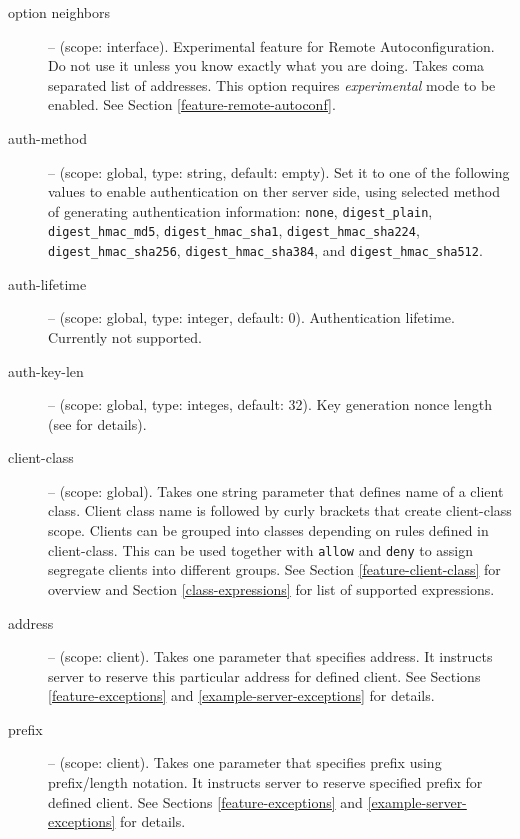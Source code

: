 \begin{description}
 \item[option neighbors] -- (scope: interface). Experimental feature
   for Remote Autoconfiguration. Do not use it unless you know exactly
   what you are doing. Takes coma separated list of addresses. This
   option requires \emph{experimental} mode to be enabled. See Section
   \ref{feature-remote-autoconf}.

 \item[auth-method] -- (scope: global, type: string, default:
   empty). Set it to one of the following values to enable
   authentication on ther server side, using selected method of
   generating authentication information:
   \texttt{none}, \texttt{digest\_plain}, \texttt{digest\_hmac\_md5},
   \texttt{digest\_hmac\_sha1}, \texttt{digest\_hmac\_sha224},
   \texttt{digest\_hmac\_sha256}, \texttt{digest\_hmac\_sha384},
   and \texttt{digest\_hmac\_sha512}.

 \item[auth-lifetime] -- (scope: global, type: integer, default:
   0). Authentication lifetime. Currently not supported.

 \item[auth-key-len] -- (scope: global, type: integes, default:
   32). Key generation nonce length (see \cite{draft-aaa} for
   details).

\item[client-class] -- (scope: global). Takes one string parameter
  that defines name of a client class. Client class name is followed
  by curly brackets that create client-class scope. Clients can be
  grouped into classes depending on rules defined in
  client-class. This can be used together with \verb+allow+ and
  \verb+deny+ to assign segregate clients into different groups. See
  Section \ref{feature-client-class} for overview and Section
  \ref{class-expressions} for list of supported expressions.

\item[address] -- (scope: client). Takes one parameter that specifies
   address. It instructs server to reserve this particular address for
   defined client. See Sections \ref{feature-exceptions}
   and \ref{example-server-exceptions} for details.

\item[prefix] -- (scope: client). Takes one parameter that specifies
   prefix using prefix/length notation. It instructs server to reserve
   specified prefix for defined client. See Sections \ref{feature-exceptions}
   and \ref{example-server-exceptions} for details.

\end{description}

